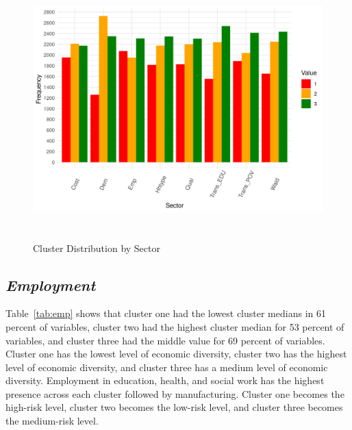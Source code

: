 \begin{figure}[htbp]
    \centering
     \includegraphics[width=1\textwidth, height=10cm]{plots/cluster_distribution.png}
     \caption{Cluster Distribution by Sector}
     \label{fig:cluster_dis}
 \end{figure}


 
\subsection{\textit{Employment}}

Table~\ref{tab:emp} shows that cluster one had the lowest cluster medians in 61 percent of variables, cluster two had the highest cluster median for 53 percent of variables, and cluster three had the middle value for 69 %
percent of variables. Cluster one has the lowest level of economic diversity, cluster two has the highest level of economic diversity, and cluster three has a medium level of economic diversity. Employment in education, health, and social work has the highest presence across each cluster followed by manufacturing. Cluster one becomes the high-risk level, cluster two becomes the low-risk level, and cluster three becomes the medium-risk level.





